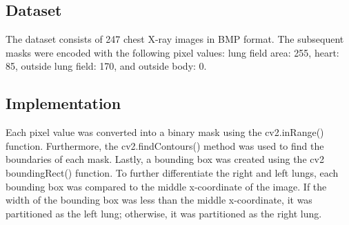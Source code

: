 \documentclass[10pt,twocolumn,letterpaper]{article}
\begin{document}
\subsection{Dataset}
The dataset \cite{DatasetForClass} consists of 247 chest X-ray images in BMP format. The subsequent masks were encoded with the following pixel values: lung field area: 255, heart: 85, outside lung field: 170, and outside body: 0.

\subsection{Implementation}
Each pixel value was converted into a binary mask using the cv2.inRange() function. Furthermore, the cv2.findContours() method was used to find the boundaries of each mask. Lastly, a bounding box was created using the cv2 boundingRect() function. To further differentiate the right and left lungs, each bounding box was compared to the middle x-coordinate of the image. If the width of the bounding box was less than the middle x-coordinate, it was partitioned as the left lung; otherwise, it was partitioned as the right lung.
\end{document}
